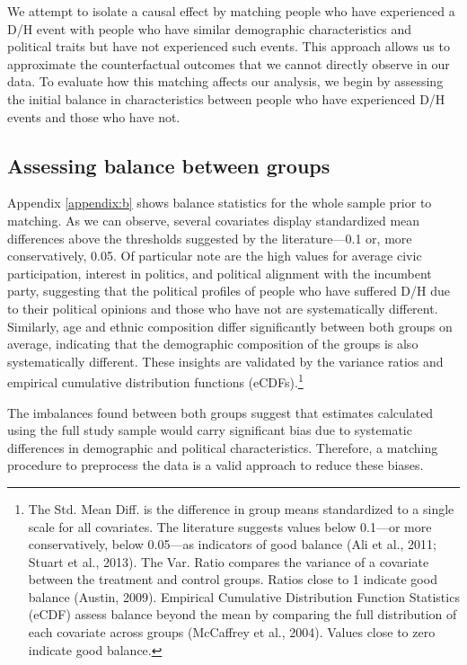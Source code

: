 \documentclass{article}
\begin{document}
We attempt to isolate a causal effect by matching people who have experienced a D/H event with people who have similar demographic characteristics and political traits but have not experienced such events. This approach allows us to approximate the counterfactual outcomes that we cannot directly observe in our data. To evaluate how this matching affects our analysis, we begin by assessing the initial balance in characteristics between people who have experienced D/H events and those who have not.

\subsection{Assessing balance between groups}

Appendix \ref{appendix:b} shows balance statistics for the whole sample prior to matching. As we can observe, several covariates display standardized mean differences above the thresholds suggested by the literature—0.1 or, more conservatively, 0.05. Of particular note are the high values for average civic participation, interest in politics, and political alignment with the incumbent party, suggesting that the political profiles of people who have suffered D/H due to their political opinions and those who have not are systematically different. Similarly, age and ethnic composition differ significantly between both groups on average, indicating that the demographic composition of the groups is also systematically different. These insights are validated by the variance ratios and empirical cumulative distribution functions (eCDFs).\footnote{The Std. Mean Diff. is the difference in group means standardized to a single scale for all covariates. The literature suggests values below 0.1—or more conservatively, below 0.05—as indicators of good balance (Ali et al., 2011; Stuart et al., 2013). The Var. Ratio compares the variance of a covariate between the treatment and control groups. Ratios close to 1 indicate good balance (Austin, 2009). Empirical Cumulative Distribution Function Statistics (eCDF) assess balance beyond the mean by comparing the full distribution of each covariate across groups (McCaffrey et al., 2004). Values close to zero indicate good balance.}

The imbalances found between both groups suggest that estimates calculated using the full study sample would carry significant bias due to systematic differences in demographic and political characteristics. Therefore, a matching procedure to preprocess the data is a valid approach to reduce these biases.
\end{document}
